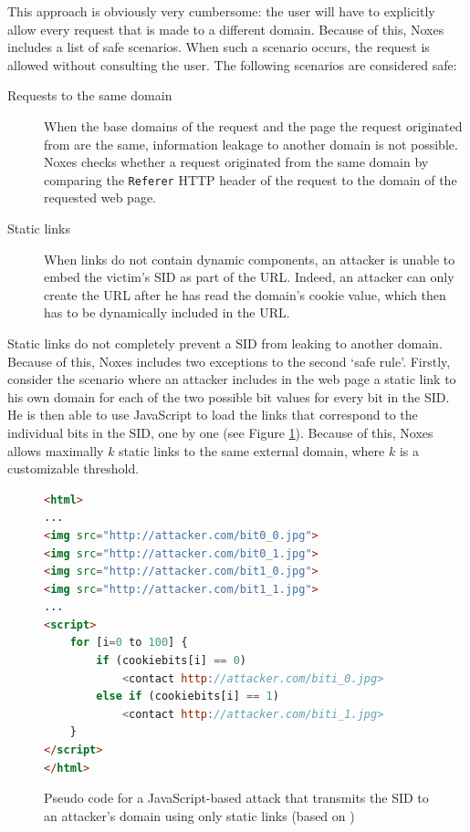This approach is obviously very cumbersome: the user will have to explicitly allow every request that is made to a different domain. Because of this, Noxes includes a list of safe scenarios. When such a scenario occurs, the request is allowed without consulting the user. The following scenarios are considered safe:
\begin{description}
	\item[Requests to the same domain] When the base domains of the request and the page the request originated from are the same, information leakage to another domain is not possible. Noxes checks whether a request originated from the same domain by comparing the \texttt{Referer} HTTP header of the request to the domain of the requested web page.
	\item[Static links] When links do not contain dynamic components, an attacker is unable to embed the victim's SID as part of the URL. Indeed, an attacker can only create the URL after he has read the domain's cookie value, which then has to be dynamically included in the URL.
\end{description}
Static links do not completely prevent a SID from leaking to another domain. Because of this, Noxes includes two exceptions to the second `safe rule'. Firstly, consider the scenario where an attacker includes in the web page a static link to his own domain for each of the two possible bit values for every bit in the SID. He is then able to use JavaScript to load the links that correspond to the individual bits in the SID, one by one (see Figure \ref{Noxes-attack}). Because of this, Noxes allows maximally $k$ static links to the same external domain, where $k$ is a customizable threshold.

\begin{figure}
\begin{lstlisting}[language=HTML]
<html>
...
<img src="http://attacker.com/bit0_0.jpg">
<img src="http://attacker.com/bit0_1.jpg">
<img src="http://attacker.com/bit1_0.jpg">
<img src="http://attacker.com/bit1_1.jpg">
...
<script>
    for [i=0 to 100] {
        if (cookiebits[i] == 0)
            <contact http://attacker.com/biti_0.jpg>
        else if (cookiebits[i] == 1)
            <contact http://attacker.com/biti_1.jpg>
    }
</script>
</html>
\end{lstlisting}
	\caption[Using static links to transmit the SID to an attacker's domain]{\label{Noxes-attack}Pseudo code for a JavaScript-based attack that transmits the SID to an attacker's domain using only static links (based on \cite{Kirda2006})}
\end{figure}

